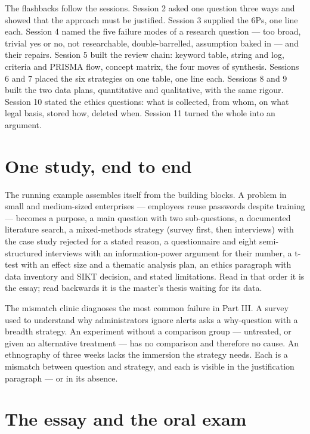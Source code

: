 \documentclass[11pt,a4paper,british,twoside=false,headings=small,chapterprefix=false,numbers=noenddot]{scrbook}
\begin{document}
The flashbacks follow the sessions. Session 2 asked one question three ways and showed that the approach must be justified. Session 3 supplied the 6Ps, one line each. Session 4 named the five failure modes of a research question --- too broad, trivial yes or no, not researchable, double-barrelled, assumption baked in --- and their repairs. Session 5 built the review chain: keyword table, string and log, criteria and PRISMA flow, concept matrix, the four moves of synthesis. Sessions 6 and 7 placed the six strategies on one table, one line each. Sessions 8 and 9 built the two data plans, quantitative and qualitative, with the same rigour. Session 10 stated the ethics questions: what is collected, from whom, on what legal basis, stored how, deleted when. Session 11 turned the whole into an argument.

\section{One study, end to end}

The running example assembles itself from the building blocks. A problem in small and medium-sized enterprises --- employees reuse passwords despite training --- becomes a purpose, a main question with two sub-questions, a documented literature search, a mixed-methods strategy (survey first, then interviews) with the case study rejected for a stated reason, a questionnaire and eight semi-structured interviews with an information-power argument for their number, a t-test with an effect size and a thematic analysis plan, an ethics paragraph with data inventory and SIKT decision, and stated limitations. Read in that order it is the essay; read backwards it is the master's thesis waiting for its data.

The mismatch clinic diagnoses the most common failure in Part III. A survey used to understand why administrators ignore alerts asks a why-question with a breadth strategy. An experiment without a comparison group --- untreated, or given an alternative treatment --- has no comparison and therefore no cause. An ethnography of three weeks lacks the immersion the strategy needs. Each is a mismatch between question and strategy, and each is visible in the justification paragraph --- or in its absence.

\section{The essay and the oral exam}
\end{document}
